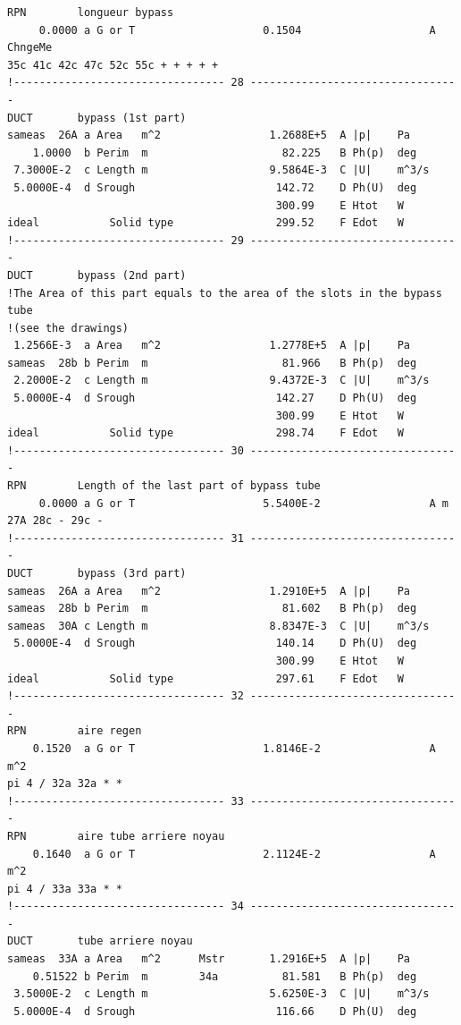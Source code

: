 \begin{linenumbers}
\begin{verbatim}
RPN        longueur bypass
     0.0000 a G or T                    0.1504                    A ChngeMe
35c 41c 42c 47c 52c 55c + + + + +
!--------------------------------- 28 ---------------------------------
DUCT       bypass (1st part)
sameas  26A a Area   m^2                 1.2688E+5  A |p|    Pa
    1.0000  b Perim  m                     82.225   B Ph(p)  deg
 7.3000E-2  c Length m                   9.5864E-3  C |U|    m^3/s
 5.0000E-4  d Srough                      142.72    D Ph(U)  deg
                                          300.99    E Htot   W
ideal           Solid type                299.52    F Edot   W
!--------------------------------- 29 ---------------------------------
DUCT       bypass (2nd part)
!The Area of this part equals to the area of the slots in the bypass tube
!(see the drawings)
 1.2566E-3  a Area   m^2                 1.2778E+5  A |p|    Pa
sameas  28b b Perim  m                     81.966   B Ph(p)  deg
 2.2000E-2  c Length m                   9.4372E-3  C |U|    m^3/s
 5.0000E-4  d Srough                      142.27    D Ph(U)  deg
                                          300.99    E Htot   W
ideal           Solid type                298.74    F Edot   W
!--------------------------------- 30 ---------------------------------
RPN        Length of the last part of bypass tube
     0.0000 a G or T                    5.5400E-2                 A m
27A 28c - 29c -
!--------------------------------- 31 ---------------------------------
DUCT       bypass (3rd part)
sameas  26A a Area   m^2                 1.2910E+5  A |p|    Pa
sameas  28b b Perim  m                     81.602   B Ph(p)  deg
sameas  30A c Length m                   8.8347E-3  C |U|    m^3/s
 5.0000E-4  d Srough                      140.14    D Ph(U)  deg
                                          300.99    E Htot   W
ideal           Solid type                297.61    F Edot   W
!--------------------------------- 32 ---------------------------------
RPN        aire regen
    0.1520  a G or T                    1.8146E-2                 A m^2
pi 4 / 32a 32a * *
!--------------------------------- 33 ---------------------------------
RPN        aire tube arriere noyau
    0.1640  a G or T                    2.1124E-2                 A m^2
pi 4 / 33a 33a * *
!--------------------------------- 34 ---------------------------------
DUCT       tube arriere noyau
sameas  33A a Area   m^2      Mstr       1.2916E+5  A |p|    Pa
    0.51522 b Perim  m        34a          81.581   B Ph(p)  deg
 3.5000E-2  c Length m                   5.6250E-3  C |U|    m^3/s
 5.0000E-4  d Srough                      116.66    D Ph(U)  deg

\end{verbatim}
\end{linenumbers}

